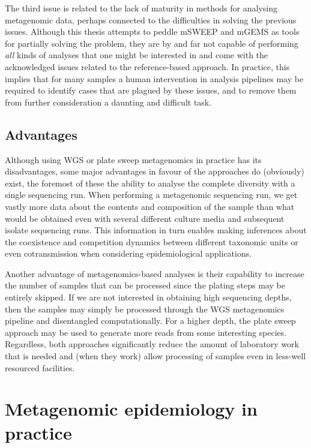\documentclass[officiallayout]{tktla}
\begin{document}
The third issue is related to the lack of maturity in methods for
analysing metagenomic data, perhaps connected to the difficulties in
solving the previous issues. Although this thesis attempts to peddle
mSWEEP and mGEMS as tools for partially solving the problem, they are
by and far not capable of performing \textit{all} kinds of analyses
that one might be interested in and come with the acknowledged issues
related to the reference-based approach. In practice, this implies
that for many samples a human intervention in analysis pipelines may
be required to identify cases that are plagued by these issues, and to
remove them from further consideration \textemdash  a daunting and
difficult task.

\subsection{Advantages}

Although using WGS or plate sweep metagenomics in practice has its
disadvantages, some major advantages in favour of the approaches do
(obviously) exist, the foremost of these the ability to analyse the
complete diversity with a single sequencing run. When performing a
metagenomic sequencing run, we get vastly more data about the contents
and composition of the sample than what would be obtained even with
several different culture media and subsequent isolate sequencing
runs. This information in turn enables making inferences about the
coexistence and competition dynamics between different taxonomic units
or even cotransmission when considering epidemiological applications.

Another advantage of metagenomics-based analyses is their capability
to increase the number of samples that can be processed since the
plating steps may be entirely skipped. If we are not interested in
obtaining high sequencing depths, then the samples may simply be
processed through the WGS metagenomics pipeline and disentangled
computationally. For a higher depth, the plate sweep approach may be
used to generate more reads from some interesting species. Regardless,
both approaches significantly reduce the amount of laboratory work
that is needed and (when they work) allow processing of samples even
in less-well resourced facilities.

\section{Metagenomic epidemiology in practice}
\end{document}
